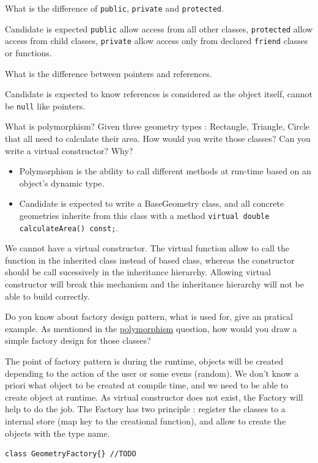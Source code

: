 \documentclass[answers]{exam}
\begin{document}
\begin{questions}
\question What is the difference of \lstinline{public}, \lstinline{private} and \lstinline{protected}.
\begin{solution}[.2in]
	Candidate is expected \lstinline{public} allow access from all other classes, \lstinline{protected} allow access from child classes, \lstinline{private} allow access only from declared \lstinline{friend} classes or functions.
\end{solution}

\question What is the difference between pointers and references.
\begin{solution}[.2in]
    Candidate is expected to know references is considered as the object itself, cannot be \lstinline{null} like pointers.
\end{solution}

\question \label{cpp:dynamic_polymorphism}What is polymorphism? Given three geometry types : Rectangle, Triangle, Circle that all need to calculate their area. How would you write those classes? Can you write a virtual constructor? Why?
\begin{solution}[.2in]
\begin{itemize}
	\item Polymorphism is the ability to call different methods at run-time based on an object’s dynamic type. 
	\item Candidate is expected to write a BaseGeometry class, and all concrete geometries inherite from this class with a method \lstinline{virtual double calculateArea() const;}.
\end{itemize}
We cannot have a virtual constructor. The virtual function allow to call the function in the inherited class instead of based class, whereas the constructor should be call sucessively in the inheritance hierarchy. Allowing virtual constructor will break this mechanism and the inheritance hierarchy will not be able to build correctly.
\end{solution}

\question Do you know about factory design pattern, what is used for, give an pratical example. As mentioned in the  \hyperref[cpp:dynamic_polymorphism]{polymorphism} question, how would you draw a simple factory design for those classes?
\begin{solution}[.2in]
The point of factory pattern is during the runtime, objects will be created depending to the action of the user or some evens (random). We don't know a priori what object to be created at compile time, and we need to be able to  create object at runtime. As virtual constructor does not exist, the Factory will help to do the job. The Factory has two principle : register the classes to a internal store (map key to the creational function), and allow to create the objects with the type name.
\begin{lstlisting}
class GeometryFactory{} //TODO
\end{lstlisting}
\end{solution}


\end{questions}
\end{document}
